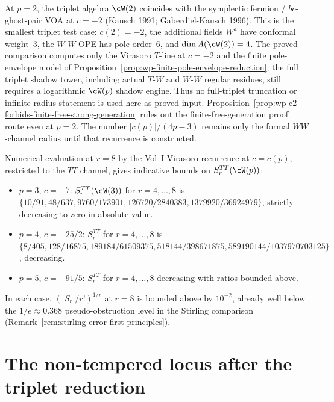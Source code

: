\begin{remark}
\label{rem:p2-symplectic-fermion-truncation}
At $p = 2$, the triplet algebra $\cW(2)$ coincides with the
symplectic fermion / $bc$-ghost-pair VOA at $c = -2$ (Kausch 1991;
Gaberdiel-Kausch 1996). This is the smallest triplet test case:
$c(2)=-2$, the additional fields $W^a$ have conformal weight~$3$,
the $W$-$W$ OPE has pole order~$6$, and
$\dim A(\cW(2))=4$. The proved comparison computes only the Virasoro
$T$-line at $c=-2$ and the finite pole-envelope model
of Proposition~\ref{prop:wp-finite-pole-envelope-reduction}; the full
triplet shadow tower, including actual $T$-$W$ and $W$-$W$ regular
residues, still requires a logarithmic $\cW(p)$ shadow engine. Thus no
full-triplet truncation or infinite-radius statement is used here as
proved input. Proposition~\ref{prop:wp-c2-forbids-finite-free-strong-generation}
rules out the finite-free-generation proof route even at $p=2$. The
number $\lvert c(p)\rvert/(4p-3)$ remains only the formal $WW$-channel
radius until that recurrence is constructed.
\end{remark}

\begin{remark}
\label{rem:wp-finite-r-evidence}
Numerical evaluation at $r = 8$ by the Vol~I Virasoro recurrence at
$c = c(p)$, restricted to the $TT$ channel, gives
indicative bounds on $S_r^{TT}(\cW(p))$:
\begin{itemize}[nosep]
\item $p = 3$, $c = -7$: $S_r^{TT}(\cW(3))$ for $r = 4, \ldots, 8$ is
 $\{10/91, 48/637, 9760/173901, 126720/2840383, 1379920/36924979\}$,
 strictly decreasing to zero in absolute value.
\item $p = 4$, $c = -25/2$: $S_r^{TT}$ for $r = 4, \ldots, 8$ is
 $\{8/405, 128/16875, 189184/61509375, 518144/398671875,
 589190144/1037970703125\}$, decreasing.
\item $p = 5$, $c = -91/5$: $S_r^{TT}$ for $r = 4, \ldots, 8$
 decreasing with ratios bounded above.
\end{itemize}
In each case, $(\lvert S_r \rvert / r!)^{1/r}$ at $r = 8$ is bounded
above by $10^{-2}$, already well below the $1/e \approx 0.368$
pseudo-obstruction level in the Stirling comparison
(Remark~\ref{rem:stirling-error-first-principles}).
\end{remark}

\section{The non-tempered locus after the triplet reduction}
\label{sec:non-tempered-locus-triplet-reduction}


